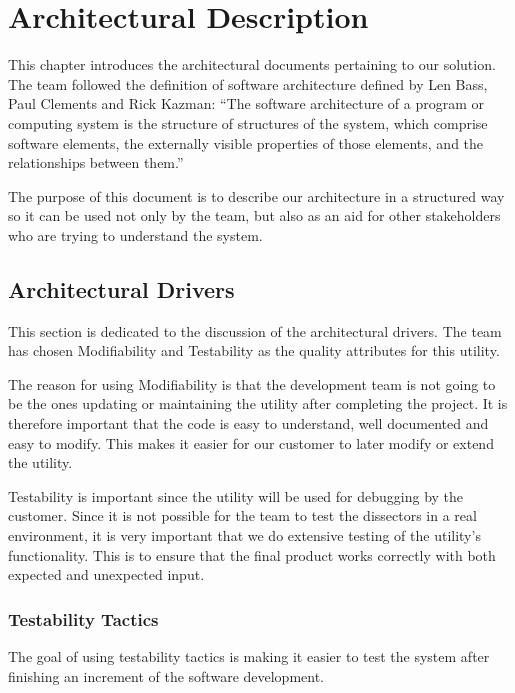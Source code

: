 \chapter{Architectural Description}
This chapter introduces the architectural documents pertaining to our solution. The team followed the definition of software architecture defined by Len Bass, Paul Clements and Rick Kazman: ``The software architecture of a program or computing
system is the structure of structures of the system, which comprise software elements, the externally visible properties of those elements, and the relationships between them.''~\cite[p.3]{Bass2003}

The purpose of this document is to describe our architecture in a structured way so it can be used not only by the team, but also as an aid for other stakeholders who are trying to understand the system.

\section{Architectural Drivers}
This section is dedicated to the discussion of the architectural drivers.
The team has chosen Modifiability and Testability as the quality attributes for this \gls{utility}. 

The reason for using Modifiability is that the development team is not going to be the ones updating or maintaining the \gls{utility} after completing the project. It is therefore important that the code is easy to understand, well documented and easy to modify. This makes it easier for our customer to later modify or extend the \gls{utility}.

Testability is important since the \gls{utility} will be used for debugging by the customer.  Since it is not possible for the team to test the \glspl{dissector} in a real environment, it is very important that we do extensive testing of the utility's functionality. This is to ensure that the final product works correctly with both expected and unexpected input.

\subsection{Testability Tactics}
The goal of using testability tactics is making it easier to test the system after finishing an increment of the software development. 

